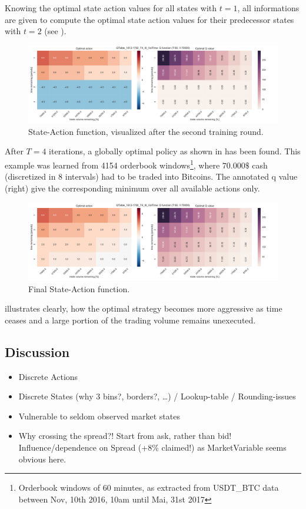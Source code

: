 Knowing the optimal state action values for all states with $t=1$, all informations are given to compute the optimal state action values for their predecessor states with $t=2$ (see ).

\begin{figure}[ht]
	\centering
   \includegraphics[width=1.\textwidth]{content/drawings/heatmap_3months_t2}
	\caption{State-Action function, visualized after the second training round.}
	\label{fig:heatmap:t2}
\end{figure}

After $T=4$ iterations, a globally optimal policy as shown in  has been found. This example was learned from 4154 orderbook windows\footnote{Orderbook windows of 60 minutes, as extracted from USDT\_BTC data between Nov, 10th 2016, 10am until Mai, 31st 2017}, where $70.000\$$ cash (discretized in 8 intervals) had to be traded into Bitcoins. The annotated q value (right) give the corresponding minimum over all available actions only.

\begin{figure}[ht]
	\centering
   \includegraphics[width=1.\textwidth]{content/drawings/heatmap_3months}
	\caption{Final State-Action function.}
	\label{fig:heatmap}
\end{figure}

 illustrates clearly, how the optimal strategy becomes more aggressive as time ceases and a large portion of the trading volume remains unexecuted.

\subsection{Discussion}
\begin{itemize}
\item Discrete Actions
\item Discrete States (why 3 bins?, borders?, \ldots{}) / Lookup-table / Rounding-issues
\item Vulnerable to seldom observed market states

\item Why crossing the spread?! Start from ask, rather than bid!\\
Influence/dependence on Spread (+8\% claimed!) as MarketVariable seems obvious here.
\end{itemize}


